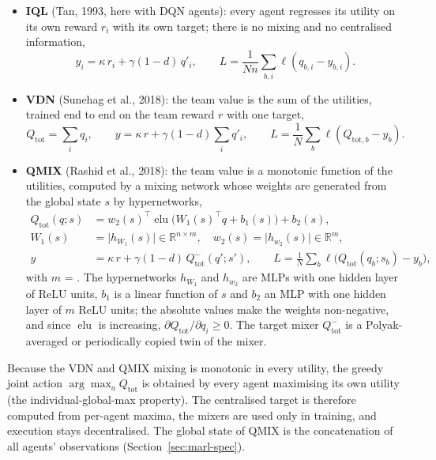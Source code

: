 \begin{itemize}
  \item \textbf{IQL} (Tan, 1993, here with DQN agents): every agent regresses
    its utility on its own reward $r_i$ with its own target; there is no
    mixing and no centralised information,
    \begin{equation}
      y_i = \kappa\, r_i + \gamma (1 - d)\, q'_i, \qquad
      L = \frac{1}{N n} \sum_{b, i} \ell(q_{b,i} - y_{b,i}).
    \end{equation}
  \item \textbf{VDN} (Sunehag et al., 2018): the team value is the sum of the
    utilities, trained end to end on the team reward $r$ with one target,
    \begin{equation}
      Q_\text{tot} = \sum_i q_i, \qquad
      y = \kappa\, r + \gamma (1 - d) \sum_i q'_i, \qquad
      L = \frac{1}{N} \sum_b \ell(Q_{\text{tot},b} - y_b).
    \end{equation}
  \item \textbf{QMIX} (Rashid et al., 2018): the team value is a monotonic
    function of the utilities, computed by a mixing network whose weights are
    generated from the global state $s$ by hypernetworks,
    \begin{align}
      Q_\text{tot}(q; s) &= w_2(s)^{\top} \operatorname{elu}\bigl(W_1(s)^{\top} q
        + b_1(s)\bigr) + b_2(s), \label{eq:marl-qmix}\\
      W_1(s) &= \bigl|h_{W_1}(s)\bigr| \in \mathbb{R}^{n \times m}, \quad
      w_2(s) = \bigl|h_{w_2}(s)\bigr| \in \mathbb{R}^{m}, \nonumber\\
      y &= \kappa\, r + \gamma (1 - d)\, Q^-_\text{tot}(q'; s'), \qquad
      L = \frac{1}{N} \sum_b \ell\bigl(Q_\text{tot}(q_b; s_b) - y_b\bigr), \nonumber
    \end{align}
    with $m$ = . The hypernetworks $h_{W_1}$ and
    $h_{w_2}$ are MLPs with one hidden layer of  ReLU
    units, $b_1$ is a linear function of $s$ and $b_2$ an MLP with one hidden
    layer of $m$ ReLU units; the absolute values make the weights
    non-negative, and since $\operatorname{elu}$ is increasing,
    $\partial Q_\text{tot} / \partial q_i \ge 0$. The target mixer $Q^-_\text{tot}$
    is a Polyak-averaged or periodically copied twin of the mixer.
\end{itemize}

Because the VDN and QMIX mixing is monotonic in every utility, the greedy joint
action $\arg\max_{a} Q_\text{tot}$ is obtained by every agent maximising its own
utility (the individual-global-max property). The centralised target is
therefore computed from per-agent maxima, the mixers are used only in
training, and execution stays decentralised. The global state of QMIX is the
concatenation of all agents' observations (Section~\ref{sec:marl-spec}).

